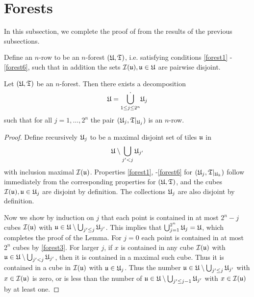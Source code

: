 \section{Forests}
In this subsection, we complete the proof of  from the results of the previous subsections.

Define an $n$-row to be an $n$-forest $({\mathfrak U}, {\mathfrak T})$, i.e. satisfying conditions \eqref{forest1} - \eqref{forest6}, such that in addition the sets ${\mathcal{I}}({\mathfrak u}), {\mathfrak u} \in {\mathfrak U}$ are pairwise disjoint.

\begin{lemma}
    \label{forest-row-decomposition}
    \leanok
    Let $({\mathfrak U}, {\mathfrak T})$ be an $n$-forest. Then there exists a decomposition
    $$
        {\mathfrak U} = \dot{\bigcup_{1 \le j \le 2^n}} {\mathfrak U}_j
    $$
    such that for all $j = 1, \dotsc, 2^n$ the pair $({\mathfrak U}_j, {\mathfrak T}|_{{\mathfrak U}_j})$ is an $n$-row.
\end{lemma}

\begin{proof}
    \leanok
    Define recursively ${\mathfrak U}_j$ to be a maximal disjoint set of tiles ${\mathfrak u}$ in
    $$
        {\mathfrak U} \setminus \bigcup_{j' < j} {\mathfrak U}_{j'}
    $$
    with inclusion maximal ${\mathcal{I}}({\mathfrak u})$. Properties \eqref{forest1}, -\eqref{forest6} for $({\mathfrak U}_j, {\mathfrak T}|_{{\mathfrak U}_k})$ follow immediately from the corresponding properties for $({\mathfrak U}, {\mathfrak T})$, and the cubes ${\mathcal{I}}({\mathfrak u}), {\mathfrak u} \in {\mathfrak U}_j$ are disjoint by definition. The collections ${\mathfrak U}_j$ are also disjoint by definition.

    Now we show by induction on $j$ that each point is contained in at most $2^n - j$ cubes ${\mathcal{I}}({\mathfrak u})$ with ${\mathfrak u} \in {\mathfrak U} \setminus \bigcup_{j' \le j} {\mathfrak U}_{j'}$. This implies that $\bigcup_{j = 1}^{2^n} {\mathfrak U}_j = {\mathfrak U}$, which completes the proof of the Lemma. For $j = 0$ each point is contained in at most $2^n$ cubes by \eqref{forest3}. For larger $j$, if $x$ is contained in any cube ${\mathcal{I}}({\mathfrak u})$ with ${\mathfrak u} \in {\mathfrak U} \setminus \bigcup_{j' < j} {\mathfrak U}_{j'}$, then it is contained in a maximal such cube. Thus it is contained in a cube in ${\mathcal{I}}({\mathfrak u})$ with ${\mathfrak u} \in {\mathfrak U}_j$. Thus the number ${\mathfrak u} \in {\mathfrak U} \setminus \bigcup_{j' \le j} {\mathfrak U}_{j'}$ with $x\in {\mathcal{I}}({\mathfrak u})$ is zero, or is less than the number of ${\mathfrak u} \in {\mathfrak U} \setminus \bigcup_{j' \le j-1} {\mathfrak U}_{j'}$ with $x \in {\mathcal{I}}({\mathfrak u})$ by at least one.
\end{proof}

